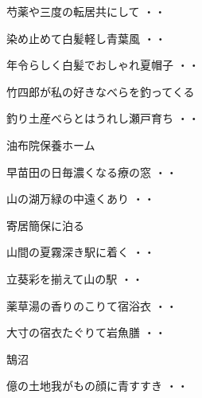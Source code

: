 \begin{shiika}芍薬や三度の転居共にして
\hfill{・・}\end{shiika}
\vspace{0.6cm}
\begin{shiika}染め止めて白髪軽し青葉風
\hfill{・・}\end{shiika}
\vspace{0.6cm}
\begin{shiika}年令らしく白髪でおしゃれ夏帽子
\hfill{・・}\end{shiika}
\vspace{0.6cm}
竹四郎が私の好きなべらを釣ってくる
\begin{shiika}釣り土産べらとはうれし瀬戸育ち
\hfill{・・}\end{shiika}
\vspace{0.6cm}
油布院保養ホーム
\begin{shiika}早苗田の日毎濃くなる療の窓
\hfill{・・}\end{shiika}
\begin{shiika}山の湖万緑の中遠くあり
\hfill{・・}\end{shiika}
\vspace{0.6cm}
寄居簡保に泊る
\begin{shiika}山間の夏霧深き駅に着く
\hfill{・・}\end{shiika}
\vspace{0.6cm}
\begin{shiika}立葵彩を揃えて山の駅
\hfill{・・}\end{shiika}
\vspace{0.6cm}
\begin{shiika}薬草湯の香りのこりて宿浴衣
\hfill{・・}\end{shiika}
\vspace{0.6cm}
\begin{shiika}大寸の宿衣たぐりて岩魚膳
\hfill{・・}\end{shiika}
\vspace{0.6cm}
鵠沼
\begin{shiika}億の土地我がもの顔に青すすき
\hfill{・・}\end{shiika}
\vspace{0.6cm}
